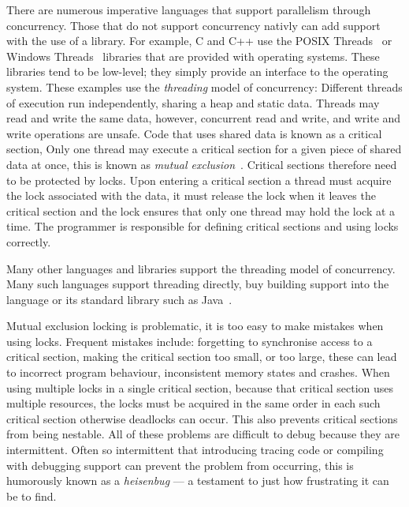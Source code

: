 There are numerous imperative languages that support parallelism through
concurrency.
Those that do not support concurrency nativly can add support
with the use of a library.
For example, 
C and C++ use the POSIX Threads~\citep{butenhof1997:pthreads} or Windows
Threads~\citep{winthreads} libraries that are provided with operating systems.
These libraries tend to be low-level;
they simply provide an interface to the operating system.
These examples use the \emph{threading} model of concurrency:
Different threads of execution run independently,
sharing a heap and static data.
Threads may read and write the same data,
however,
concurrent read and write, and write and write operations are unsafe.
Code that uses shared data is known as a critical section,
Only one thread may execute a critical section for a given piece of shared data
at once,
this is known as \emph{mutual exclusion}~\citep{Dijkstra:Mutex}.
Critical sections therefore need to be protected by locks.
Upon entering a critical section a thread must acquire the lock associated with
the data,
it must release the lock when it leaves the critical section and the lock
ensures that only one thread may hold the lock at a time.
The programmer is responsible for defining critical sections and using locks
correctly.

Many other languages and libraries support the threading model of concurrency.
Many such languages support threading directly, buy building support into the
language or its standard library such as Java~\citep{java-threads}.

Mutual exclusion locking is problematic,
it is too easy to make mistakes when using locks.
Frequent mistakes include: forgetting to synchronise access to a critical
section,
making the critical section too small, or too large,
these can lead to incorrect program behaviour, inconsistent memory states and
crashes. 
When using multiple locks in a single critical section,
because that critical section uses multiple resources,
the locks must be acquired in the same order in each such critical section
otherwise deadlocks can occur.
This also prevents critical sections from being nestable.
All of these problems are difficult to debug because they are intermittent.
Often so intermittent that introducing tracing code or compiling with debugging
support can prevent the problem from occurring,
this is humorously known as a \emph{heisenbug} ---
a testament to just how frustrating it can be to find.

